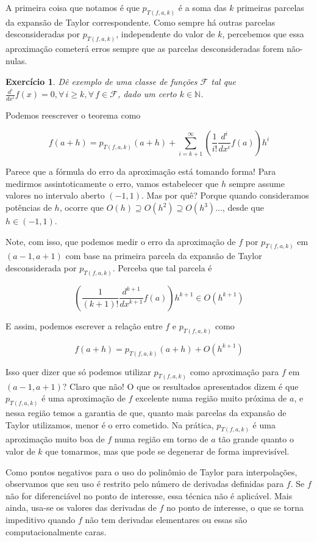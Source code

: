 \documentclass[]{article}
\newtheorem{exercicio}{Exercício}
\numberwithin{equation}{section}
\begin{document}
A primeira coisa que notamos é que $p_{T(f, a, k)}$ é a soma das $k$ primeiras parcelas da expansão de Taylor correspondente. Como sempre há outras parcelas desconsideradas por $p_{T(f, a, k)}$, independente do valor de $k$, percebemos que essa aproximação cometerá erros sempre que as parcelas desconsideradas forem não-nulas.

\begin{exercicio}
	Dê exemplo de uma classe de funções $\mathcal{F}$ tal que $\frac{d^i}{dx^i} f(x) = 0, \forall\, i \geq k, \forall\, f \in \mathcal{F}$, dado um certo $k \in \mathbb{N}$.
\end{exercicio}

Podemos reescrever o teorema como

$$
f(a + h) = p_{T(f, a, k)}(a + h) + \sum_{i = k + 1}^{\infty} \left(\frac{1}{i!} \frac{d^i}{dx^i} f(a)\right)h^i
$$

Parece que a fórmula do erro da aproximação está tomando forma! Para medirmos assintoticamente o erro, vamos estabelecer que $h$ sempre assume valores no intervalo aberto $(-1, 1)$. Mas por quê? Porque quando consideramos potências de $h$, ocorre que $O(h) \supseteq O(h^2) \supseteq O(h^3) \dots$, desde que $h \in (-1, 1)$.

Note, com isso, que podemos medir o erro da aproximação de $f$ por $p_{T(f, a, k)}$ em $(a - 1, a + 1)$ com base na primeira parcela da expansão de Taylor desconsiderada por $p_{T(f, a, k)}$. Perceba que tal parcela é

$$
\left(\frac{1}{(k + 1)!} \frac{d^{k + 1}}{dx^{k + 1}} f(a)\right)h^{k + 1} \in O(h^{k + 1})
$$

E assim, podemos escrever a relação entre $f$ e $p_{T(f, a, k)}$ como

$$
f(a + h) = p_{T(f, a, k)}(a + h) + O(h^{k + 1})
$$

Isso quer dizer que só podemos utilizar $p_{T(f, a, k)}$ como aproximação para $f$ em $(a - 1, a + 1)$? Claro que não! O que os resultados apresentados dizem é que $p_{T(f, a, k)}$ é uma aproximação de $f$ excelente numa região muito próxima de $a$, e nessa região temos a garantia de que, quanto mais parcelas da expansão de Taylor utilizamos, menor é o erro cometido. Na prática, $p_{T(f, a, k)}$ é uma aproximação muito boa de $f$ numa região em torno de $a$ tão grande quanto o valor de $k$ que tomarmos, mas que pode se degenerar de forma imprevisível.

Como pontos negativos para o uso do polinômio de Taylor para interpolações, observamos que seu uso é restrito pelo número de derivadas definidas para $f$. Se $f$ não for diferenciável no ponto de interesse, essa técnica não é aplicável. Mais ainda, usa-se os valores das derivadas de $f$ no ponto de interesse, o que se torna impeditivo quando $f$ não tem derivadas elementares ou essas são computacionalmente caras.
\end{document}
